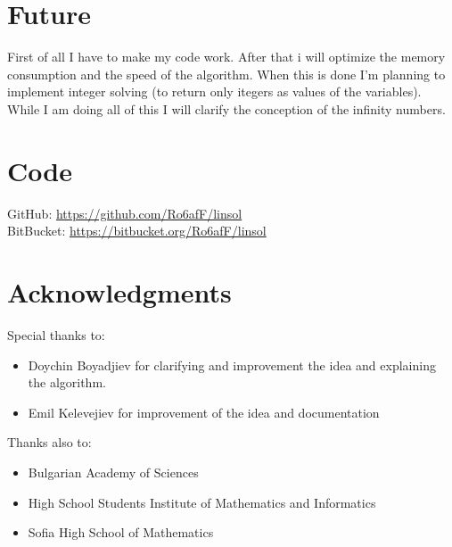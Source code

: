 \documentclass[]{article}
\begin{document}
	\section{Future}
	First of all I have to make my code work. After that i will optimize the memory consumption and the speed of the algorithm. When this is done I'm planning to implement integer solving (to return only itegers as values of the variables). While I am doing  all of this I will clarify the conception of the infinity numbers.
	\section{Code}
	GitHub: \href{https://github.com/Ro6afF/linsol}{https://github.com/Ro6afF/linsol}\\
	BitBucket: \href{https://bitbucket.org/Ro6afF/linsol}{https://bitbucket.org/Ro6afF/linsol}
	\section{Acknowledgments}
 	 	 \Large{Special thanks to:
 	 	 \begin{itemize}
 	 	 	\item Doychin Boyadjiev for clarifying and improvement the idea and explaining the algorithm.
 	 	 	\item Emil Kelevejiev for improvement of the idea and documentation
 	 	 \end{itemize}
		 }
		 \large{Thanks also to:
 	 	 \begin{itemize}
 	 	 	\item Bulgarian Academy of Sciences
 	 	 	\item High School Students Institute of Mathematics and Informatics
 	 	 	\item Sofia High School of Mathematics
 	 	 \end{itemize}}
\end{document}
